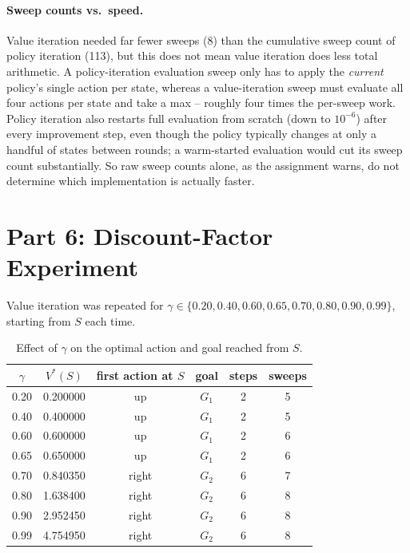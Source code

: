 \documentclass[11pt]{article}
\begin{document}
\paragraph{Sweep counts vs.\ speed.} Value iteration needed far fewer sweeps
(8) than the cumulative sweep count of policy iteration (113), but this does
not mean value iteration does less total arithmetic. A policy-iteration
evaluation sweep only has to apply the \emph{current} policy's single action
per state, whereas a value-iteration sweep must evaluate all four actions per
state and take a max -- roughly four times the per-sweep work. Policy
iteration also restarts full evaluation from scratch (down to $10^{-6}$)
after every improvement step, even though the policy typically changes at
only a handful of states between rounds; a warm-started evaluation would cut
its sweep count substantially. So raw sweep counts alone, as the assignment
warns, do not determine which implementation is actually faster.

\section{Part 6: Discount-Factor Experiment}

Value iteration was repeated for $\gamma \in \{0.20, 0.40, 0.60, 0.65, 0.70,
0.80, 0.90, 0.99\}$, starting from $S$ each time.

\begin{table}[h]
\centering
\begin{tabular}{cccccc}
\toprule
$\gamma$ & $V^\ast(S)$ & first action at $S$ & goal & steps & sweeps \\
\midrule
0.20 & 0.200000 & up    & $G_1$ & 2 & 5 \\
0.40 & 0.400000 & up    & $G_1$ & 2 & 5 \\
0.60 & 0.600000 & up    & $G_1$ & 2 & 6 \\
0.65 & 0.650000 & up    & $G_1$ & 2 & 6 \\
0.70 & 0.840350 & right & $G_2$ & 6 & 7 \\
0.80 & 1.638400 & right & $G_2$ & 6 & 8 \\
0.90 & 2.952450 & right & $G_2$ & 6 & 8 \\
0.99 & 4.754950 & right & $G_2$ & 6 & 8 \\
\bottomrule
\end{tabular}
\caption{Effect of $\gamma$ on the optimal action and goal reached from $S$.}
\label{tab:gamma}
\end{table}
\end{document}
